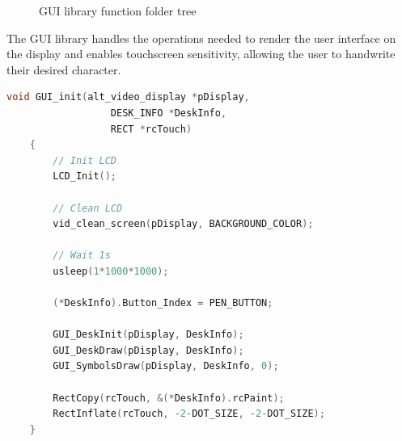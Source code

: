 \begin{figure}[h!]
    \begin{center}
    \end{center}

    \caption{GUI library function folder tree}
    \label{fig:GUI_lib_folder_tree}
    
\end{figure}

\noindent
The GUI library handles the operations needed to render the user interface on the display and enables touchscreen sensitivity, allowing the user to handwrite their desired character.

\vspace{1em}
\begin{lstlisting}[language=C, caption={GUI initialization}, label={lst:GUI_init}]
    void GUI_init(alt_video_display *pDisplay, 
                  DESK_INFO *DeskInfo, 
                  RECT *rcTouch)
    {
        // Init LCD
        LCD_Init();
        
        // Clean LCD
        vid_clean_screen(pDisplay, BACKGROUND_COLOR);
        
        // Wait 1s
        usleep(1*1000*1000);
        
        (*DeskInfo).Button_Index = PEN_BUTTON;
        
        GUI_DeskInit(pDisplay, DeskInfo);
        GUI_DeskDraw(pDisplay, DeskInfo);
        GUI_SymbolsDraw(pDisplay, DeskInfo, 0);
        
        RectCopy(rcTouch, &(*DeskInfo).rcPaint);
        RectInflate(rcTouch, -2-DOT_SIZE, -2-DOT_SIZE);
    }
\end{lstlisting}

